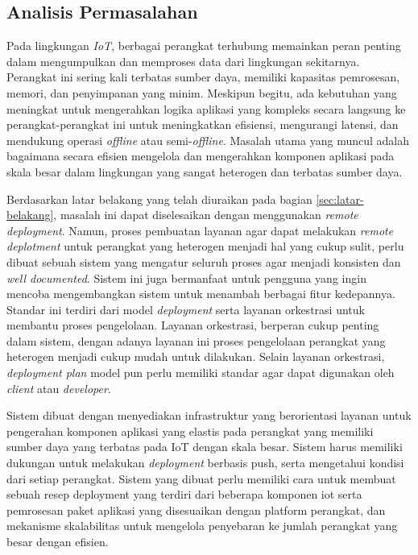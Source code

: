 \subsection{Analisis Permasalahan}
\label{sec:analisis-permasalahan}

Pada lingkungan \textit{IoT}, berbagai perangkat terhubung memainkan peran penting dalam mengumpulkan dan memproses data dari lingkungan sekitarnya. Perangkat ini sering kali terbatas sumber daya, memiliki kapasitas pemrosesan, memori, dan penyimpanan yang minim. Meskipun begitu, ada kebutuhan yang meningkat untuk mengerahkan logika aplikasi yang kompleks secara langsung ke perangkat-perangkat ini untuk meningkatkan efisiensi, mengurangi latensi, dan mendukung operasi \textit{offline} atau semi-\textit{offline}. Masalah utama yang muncul adalah bagaimana secara efisien mengelola dan mengerahkan komponen aplikasi pada skala besar dalam lingkungan yang sangat heterogen dan terbatas sumber daya.

Berdasarkan latar belakang yang telah diuraikan pada bagian \ref{sec:latar-belakang}, masalah ini dapat diselesaikan dengan menggunakan \textit{remote deployment}. Namun, proses pembuatan layanan agar dapat melakukan \textit{remote deplotment} untuk perangkat yang heterogen menjadi hal yang cukup sulit, perlu dibuat sebuah sistem yang mengatur seluruh proses agar menjadi konsisten dan \textit{well documented}. Sistem ini juga bermanfaat untuk pengguna yang ingin mencoba mengembangkan sistem untuk menambah berbagai fitur kedepannya. Standar ini terdiri dari model \textit{deployment} serta layanan orkestrasi untuk membantu proses pengelolaan. Layanan orkestrasi, berperan cukup penting dalam sistem, dengan adanya layanan ini proses pengelolaan perangkat yang heterogen menjadi cukup mudah untuk dilakukan. Selain layanan orkestrasi, \textit{deployment plan} model pun perlu memiliki standar agar dapat digunakan oleh \textit{client} atau \textit{developer}.

Sistem dibuat dengan menyediakan infrastruktur yang berorientasi layanan untuk pengerahan komponen aplikasi yang elastis pada perangkat yang memiliki sumber daya yang terbatas pada IoT dengan skala besar. Sistem harus memiliki dukungan untuk melakukan \textit{deployment} berbasis push, serta mengetahui kondisi dari setiap perangkat. Sistem yang dibuat perlu memiliki cara untuk membuat sebuah resep deployment yang terdiri dari beberapa komponen iot serta
pemrosesan paket aplikasi yang disesuaikan dengan platform perangkat, dan mekanisme skalabilitas untuk mengelola penyebaran ke jumlah perangkat yang besar dengan efisien.

